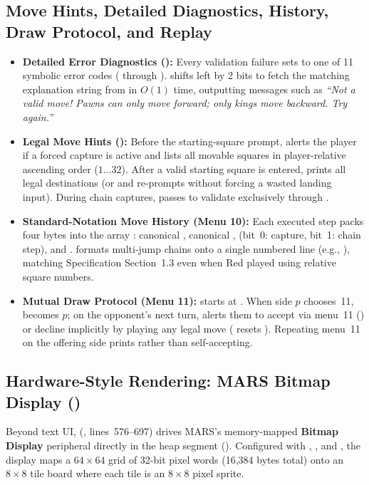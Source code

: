 \subsection{Move Hints, Detailed Diagnostics, History, Draw Protocol, and Replay}
\label{sec:qol_gameplay}
\begin{itemize}
    \item \textbf{Detailed Error Diagnostics ():} Every validation failure sets  to one of 11 symbolic error codes ( through ).  shifts  left by 2 bits to fetch the matching explanation string from  in $O(1)$ time, outputting messages such as \emph{``Not a valid move! Pawns can only move forward; only kings move backward. Try again.''}
    \item \textbf{Legal Move Hints ():} Before the starting-square prompt,  alerts the player if a forced capture is active and lists all movable squares in player-relative ascending order ($1 \dots 32$). After a valid starting square is entered,  prints all legal destinations (or  and re-prompts without forcing a wasted landing input). During chain captures,  passes  to validate exclusively through .
    \item \textbf{Standard-Notation Move History (Menu 10):} Each executed step packs four bytes into the array : canonical , canonical ,  (bit~0: capture, bit~1: chain step), and .  formats multi-jump chains onto a single numbered line (e.g., ), matching Specification Section~1.3 even when Red played using relative square numbers.
    \item \textbf{Mutual Draw Protocol (Menu 11):}  starts at . When side $p$ chooses~11,  becomes $p$; on the opponent's next turn,  alerts them to accept via menu~11 () or decline implicitly by playing any legal move ( resets ). Repeating menu~11 on the offering side prints  rather than self-accepting.
\end{itemize}

\subsection{Hardware-Style Rendering: MARS Bitmap Display ()}
\label{sec:bitmap}
Beyond text UI,  (, lines~576--697) drives MARS's memory-mapped \textbf{Bitmap Display} peripheral directly in the heap segment (). Configured with , , and , the display maps a $64 \times 64$ grid of 32-bit  pixel words (16,384 bytes total) onto an $8 \times 8$ tile board where each tile is an $8 \times 8$ pixel sprite.

